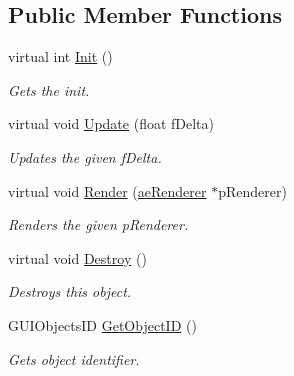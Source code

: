\subsection*{Public Member Functions}
\begin{DoxyCompactItemize}
\item 
virtual int \hyperlink{classae_g_u_i_object_a7a3af664fd1650365a863ea84723c857}{Init} ()
\begin{DoxyCompactList}\small\item\em Gets the init. \end{DoxyCompactList}\item 
virtual void \hyperlink{classae_g_u_i_object_a99f3c290206292214fd7caa214875169}{Update} (float f\+Delta)
\begin{DoxyCompactList}\small\item\em Updates the given f\+Delta. \end{DoxyCompactList}\item 
virtual void \hyperlink{classae_g_u_i_object_a6cda0c5222c9d0a9915712c3b2f29090}{Render} (\hyperlink{classae_core_1_1ae_renderer}{ae\+Renderer} $\ast$p\+Renderer)
\begin{DoxyCompactList}\small\item\em Renders the given p\+Renderer. \end{DoxyCompactList}\item 
virtual void \hyperlink{classae_g_u_i_object_afda42b1e96942ad46379b468fd75359c}{Destroy} ()\hypertarget{classae_g_u_i_object_afda42b1e96942ad46379b468fd75359c}{}\label{classae_g_u_i_object_afda42b1e96942ad46379b468fd75359c}

\begin{DoxyCompactList}\small\item\em Destroys this object. \end{DoxyCompactList}\item 
G\+U\+I\+Objects\+ID \hyperlink{classae_g_u_i_object_a3bcd6d568f058891c59a1e9b700d9427}{Get\+Object\+ID} ()
\begin{DoxyCompactList}\small\item\em Gets object identifier. \end{DoxyCompactList}\end{DoxyCompactItemize}
